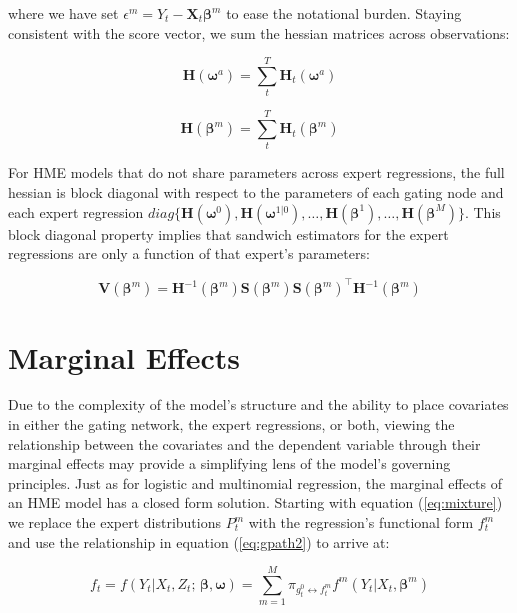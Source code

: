 \documentclass[12pt]{article}
\newcommand{\Ht}[1]{\mathbf{H}_{t}(#1)}
\newcommand{\HH}[1]{\boldsymbol{H}(#1)}
\newcommand{\HI}[1]{\boldsymbol{H}^{-1}(#1)}
\newcommand{\gateprod}[2]{\pi_{#1 \longleftrightarrow #2}}
\begin{document}
where we have set $\epsilon^{m} = Y_{t} - \boldsymbol{X}_{t} \boldsymbol{\beta}^{m}$
to ease the notational burden. Staying consistent with the score vector, we
sum the hessian matrices across observations:

\begin{equation}
  \HH{\boldsymbol{\omega}^{a}} = \sum_{t}^{T} \Ht{\boldsymbol{\omega}^{a}}
\end{equation}


\begin{equation}
  \HH{\boldsymbol{\beta}^{m}} = \sum_{t}^{T} \Ht{\boldsymbol{\beta}^{m}}
\end{equation}

For HME models that do not share parameters across expert regressions, the full
hessian is block diagonal with respect to the parameters of each gating node and
each expert regression
$diag \{ \HH{\boldsymbol{\omega}^{0}}, \HH{\boldsymbol{\omega}^{1|0}}, \ldots, \HH{\boldsymbol{\beta}^{1}}, \ldots, \HH{\boldsymbol{\beta}^{M}} \}$.
This block diagonal property implies that sandwich estimators for the expert
regressions are only a function of that expert's parameters:

\begin{equation}
  \boldsymbol{V}(\boldsymbol{\beta}^{m}) = \HI{\boldsymbol{\beta}^{m}} \boldsymbol{S}(\boldsymbol{\beta}^{m}) \boldsymbol{S}(\boldsymbol{\beta}^{m})^\top \HI{\boldsymbol{\beta}^{m}}
\end{equation}




\section{Marginal Effects} \label{sec:MarginalEffects}

Due to the complexity of the model's structure and the ability to 
place covariates in either the gating network, the expert regressions,
or both, viewing the relationship between the covariates and the dependent
variable through their marginal effects may provide a simplifying lens of the 
model's governing principles. Just as for logistic and multinomial regression,
the marginal effects of an HME model has a closed form solution. Starting
with equation (\ref{eq:mixture}) we replace the expert distributions
$P^{m}_{t}$ with the regression's functional form $f^{m}_{t}$ and use
the relationship in equation (\ref{eq:gpath2}) to arrive at: 

\begin{equation} \label{eq:mixture2}
  f_{t} = f(Y_{t} | X_{t}, Z_{t}; \, \boldsymbol{\beta}, \boldsymbol{\omega}) = \sum_{m=1}^{M} \gateprod{g^{0}_{t}}{f^{m}_{t}} f^{m}(Y_{t} | X_{t}, \boldsymbol{\beta}^{m})
\end{equation}
\end{document}
